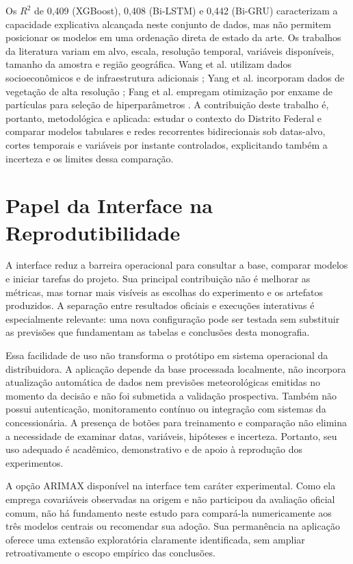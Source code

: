 Os $R^2$ de 0,409 (XGBoost), 0,408 (Bi-LSTM) e 0,442 (Bi-GRU) caracterizam a capacidade explicativa alcançada neste conjunto de dados, mas não permitem posicionar os modelos em uma ordenação direta de estado da arte. Os trabalhos da literatura variam em alvo, escala, resolução temporal, variáveis disponíveis, tamanho da amostra e região geográfica. Wang et al. utilizam dados socioeconômicos e de infraestrutura adicionais \cite{zhang2023deep}; Yang et al. incorporam dados de vegetação de alta resolução \cite{smith2021hybrid}; Fang et al. empregam otimização por enxame de partículas para seleção de hiperparâmetros \cite{saha2019machine}. A contribuição deste trabalho é, portanto, metodológica e aplicada: estudar o contexto do Distrito Federal e comparar modelos tabulares e redes recorrentes bidirecionais sob datas-alvo, cortes temporais e variáveis por instante controlados, explicitando também a incerteza e os limites dessa comparação.

\section{Papel da Interface na Reprodutibilidade}\label{sec:discussao_interface}

A interface reduz a barreira operacional para consultar a base, comparar modelos e iniciar tarefas do projeto. Sua principal contribuição não é melhorar as métricas, mas tornar mais visíveis as escolhas do experimento e os artefatos produzidos. A separação entre resultados oficiais e execuções interativas é especialmente relevante: uma nova configuração pode ser testada sem substituir as previsões que fundamentam as tabelas e conclusões desta monografia.

Essa facilidade de uso não transforma o protótipo em sistema operacional da distribuidora. A aplicação depende da base processada localmente, não incorpora atualização automática de dados nem previsões meteorológicas emitidas no momento da decisão e não foi submetida a validação prospectiva. Também não possui autenticação, monitoramento contínuo ou integração com sistemas da concessionária. A presença de botões para treinamento e comparação não elimina a necessidade de examinar datas, variáveis, hipóteses e incerteza. Portanto, seu uso adequado é acadêmico, demonstrativo e de apoio à reprodução dos experimentos.

A opção ARIMAX disponível na interface tem caráter experimental. Como ela emprega covariáveis observadas na origem e não participou da avaliação oficial comum, não há fundamento neste estudo para compará-la numericamente aos três modelos centrais ou recomendar sua adoção. Sua permanência na aplicação oferece uma extensão exploratória claramente identificada, sem ampliar retroativamente o escopo empírico das conclusões.

